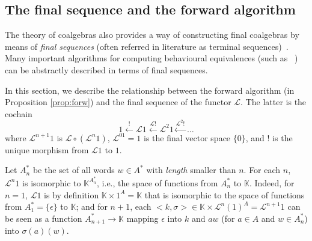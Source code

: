 \documentclass[3p]{elsarticle}
\newcommand{\cbox}[1]{\vspace{0.2cm}\noindent
  \fbox{\parbox{.97\textwidth}{#1}}\vspace{0.2cm}}
\newcommand{\fL}{\mathcal{L}}    %
\newcommand{\vectproduct}{\times} %
\newcommand{\beh}[3]{\left[\!\left[ #1 \right]\!\right]^{#2}_{#3}} %
\newcommand{\comp}{\circ}               %
\newcommand{\K}{\mathbb{K}}            %
\newcommand{\ann}{o}                    %
\newcommand{\Span}{\mathrm{span}}  %
\begin{document}


\subsection{The final sequence and the forward algorithm}\label{sec:finalsequence}
%

The theory of coalgebras also provides a way of constructing final
coalgebras by means of \emph{final sequences} (often referred in
literature as terminal sequences)~\cite{Barr93}. Many important
algorithms for computing behavioural equivalences (such as
~\cite{KannelakisSmolka}) can be abstractly described in terms of
final sequences.


In this section, we describe the relationship between the forward
algorithm (in Proposition \ref{prop:forw}) and the final sequence of
the functor $\fL$. The latter is the cochain
$$1 \stackrel{!}{\longleftarrow} \fL1\stackrel{\fL!}{\longleftarrow} \fL^{2}1 \stackrel{\fL^2!}{\longleftarrow} \dots$$
where $\fL^{n+1}1$ is $\fL\comp (\fL^{n}1)$, $\fL^01=1$ is the final
vector space $\{0\}$, and $!$ is the unique morphism from $\fL1$ to
$1$.

Let $A^*_{n}$ be the set of all words $w\in A^*$ with \emph{length}
smaller than $n$. For each $n$, $\fL^n1$ is isomorphic to $\K^{A^*_{
n}}$, i.e., the space of functions from $A^*_{n}$ to $\K$. Indeed,
for $n=1$, $\fL1$ is by definition $\K\vectproduct 1^A=\K$ that is
isomorphic to the space of functions from $A^*_{1}=\{\epsilon\}$ to
$\K$; and for $n+1$, each $<k, \sigma> \in \K\vectproduct
\fL^n(1)^A=\fL^{n+1}1$ can be seen as a function $A^*_{ n+1} \to \K$
mapping $\epsilon$ into $k$ and $aw$ (for $a\in A$ and $w\in
A^*_{n}$) into $\sigma(a)(w)$.
\end{document}
